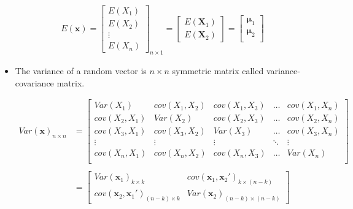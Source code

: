 \documentclass[10pt, twoside, a4paper]{book}
\theoremstyle{definition}
\begin{document}
\begin{itemize}
	\begin{equation*}
\renewcommand{\arraystretch}{1.6}
\begin{array}{ll}

E(\bm x) = 
\begin{bmatrix}
E(X_1) \\ E(X_2) \\ \vdots \\ E(X_n)
\end{bmatrix}_{n \times 1} = 
\begin{bmatrix}
E(\bm X_1) \\ E(\bm X_2)
\end{bmatrix} =
\begin{bmatrix}
\bm \mu_1 \\ \bm \mu_2 \\
\end{bmatrix}
\end{array}
\end{equation*}
	
	\item The variance of a random vector is $n \times n$ symmetric matrix called
variance-covariance matrix.

\begin{equation*}
\renewcommand{\arraystretch}{1.6}
\begin{array}{ll}

Var(\bm x)_{n \times n} & = 
\begin{bmatrix}
Var(X_1) & cov(X_1, X_2) & cov(X_1, X_3) & \hdots & cov(X_1, X_n) \\
cov(X_2, X_1) & Var(X_2) & cov(X_2, X_3) & \hdots & cov(X_2, X_n) \\
cov(X_3, X_1) & cov(X_3, X_2) & Var(X_3) & \hdots & cov(X_3, X_n) \\
\vdots & \vdots & \vdots & \ddots  & \vdots \\
cov(X_n, X_1) & cov(X_n, X_2) & cov(X_n, X_3) & \hdots & Var(X_n) \\
\end{bmatrix} \\ \\
 & = 
 
\begin{bmatrix}
Var(\bm x_1)_{k \times k} & cov(\bm x_1, \bm x_2')_{k \times (n-k)} \\ 
cov(\bm x_2, \bm x_1')_{(n-k) \times k}& Var(\bm x_2)_{(n-k) \times (n-k)}
\end{bmatrix}
\end{array}
\end{equation*}


\end{itemize}
\end{document}
